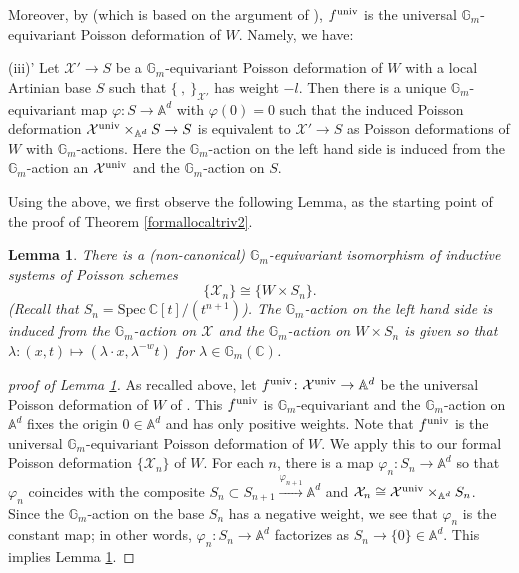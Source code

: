 \documentclass[12pt,a4paper]{amsart}
\newtheorem{Lem}[Thm]{Lemma}
\theoremstyle{remark}
\theoremstyle{definition}
\def\C{\mathbb{C}}
\def\G{\mathbb{G}}
\def\A{\mathbb{A}}
\begin{document}
Moreover, by \cite[Corollary (2.4)]{Namg} (which is based on the argument of \cite{Rim}), $f^{\rm univ}$ is the universal $\G_m$-equivariant Poisson deformation of $W$.   
Namely, we have: \vspace{0.2cm}

(iii)' Let $\mathcal{X}' \to S$ be a $\G_m$-equivariant Poisson deformation of $W$ with a local Artinian base $S$ such that $\{\:, \:\}_{\mathcal{X}'}$ has weight $-l$.  
Then there is a unique $\G_m$-equivariant map $\varphi: S \to \A^d$ with $\varphi (0) = 0$ such that the induced Poisson deformation $\mathcal{X}^{\rm univ}\times_{\A^d}S \to S$ is equivalent to $\mathcal{X}' \to S$ as Poisson deformations 
of $W$ with $\G_m$-actions. Here the $\G_m$-action on the left hand side is induced from the 
$\G_m$-action an $\mathcal{X}^{\rm univ}$ and the $\G_m$-action on $S$. 

Using the above, we first observe the following Lemma, 
as the starting point of the proof of Theorem \ref{formallocaltriv2}. 

\begin{Lem}\label{Lem3}
There is a (non-canonical) 
$\G_m$-equivariant isomorphism of inductive systems of Poisson schemes $$\{\mathcal{X}_n\} \cong \{W \times S_n\}.$$ 
(Recall that $S_n = \mathrm{Spec}\: \C [t]/(t^{n+1})$). 
The $\G_m$-action on the left hand side is induced from the $\G_m$-action on $\mathcal{X}$ and the 
$\G_m$-action on $W \times S_n$ is given so that 
$\lambda\colon (x, t) \mapsto (\lambda\cdot x, \lambda^{-w}t)$ for $\lambda \in \G_m(\C)$. 
\end{Lem}

\begin{proof}[proof of Lemma \ref{Lem3}] 
As recalled above, 
let $f^{\rm univ}\colon \mathcal{X}^{\rm univ} \to \A^d$ be the universal Poisson deformation of $W$ of \cite{Namb}. 
This $f^{\rm univ}$ is $\G_m$-equivariant and the $\G_m$-action on $\A^d$ fixes the origin $0 \in \A^d$ 
and has only positive weights. Note that $f^{\rm univ}$ is the universal $\G_m$-equivariant Poisson deformation of $W$. 
We apply this to our formal Poisson deformation $\{\mathcal{X}_n\}$ of $W$. For each $n$, there is a map $\varphi_n\colon S_n \to 
\A^d$ so that $\varphi_n$ coincides with the composite $S_n \subset S_{n+1} \stackrel{\varphi_{n+1}}\longrightarrow \A^d$ and 
$\mathcal{X}_n \cong \mathcal{X}^{\rm univ}\times_{\A^d}S_n$.    
Since the $\G_m$-action on the base $S_n$ has a negative weight, we see that $\varphi_n$ is the constant map; in other words, 
$\varphi_n \colon S_n \to \A^d$ factorizes as $S_n \to \{0\} \in \A^d$. This implies Lemma \ref{Lem3}. \end{proof}
\end{document}
